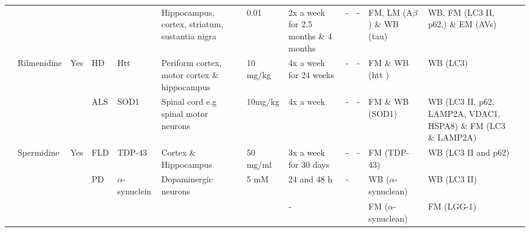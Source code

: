 \begin{landscape}
\begin{table}[p]
\begin{tabular}{lllllp{5cm}lllllll}
 &  &  &  &  & Hippocampus, cortex, striatum, sustantia nigra & 0.01 & 2x a week for 2.5 months \& 4 months & - & - & FM, LM (A$\beta$) \& WB (tau) & WB, FM (LC3 II, p62,) \& EM (AVs) & \citep{Rodriguez-Navarro2010}\\
 & Rilmenidine & Yes & HD  & Htt  & Periform cortex, motor cortex \& hippocampus & 10 mg/kg & 4x a week for 24 weeks & - & - & FM \& WB (htt ) & WB (LC3) & \citep{Rose2010}\\
 &  &  & ALS  & SOD1 & Spinal cord e.g spinal motor neurons & 10mg/kg & 4x a week   & - & - & FM \& WB (SOD1) & WB (LC3 II, p62, LAMP2A, VDAC1, HSPA8) \& FM (LC3 \& LAMP2A) & \citep{Perera2018}\\
 & Spermidine & Yes & FLD  & TDP-43  & Cortex \& Hippocampus  & 50 mg/ml & 3x a week for 30 days & - & - & FM (TDP-43) & WB (LC3 II and p62) & \citep{Wang2012}\\
 &  &  & PD  & $\alpha$-synuclein  & Dopaminergic neurons & 5 mM & 24 and 48 h & - &  & WB ($\alpha$-synuclean) & WB (LC3 II) & \citep{Buttner2014}\\
 &  &  &  &  &  &  & - &  &  & FM ($\alpha$-synuclean) &  FM (LGG-1) & \\

\bottomrule
\end{tabular}
\end{table}
\end{landscape}